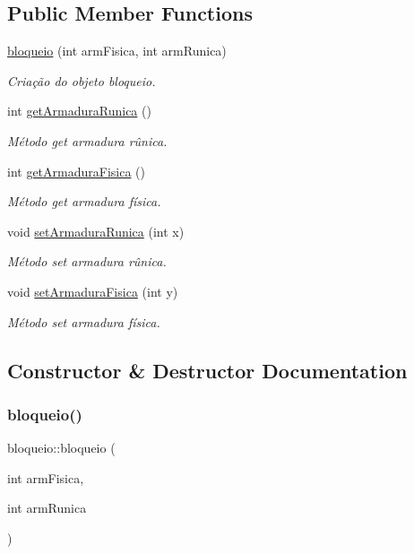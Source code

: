 \subsection*{Public Member Functions}
\begin{DoxyCompactItemize}
\item 
\mbox{\hyperlink{classbloqueio_aa43a8bb2b16af5907e8e78a54a432afe}{bloqueio}} (int arm\+Fisica, int arm\+Runica)
\begin{DoxyCompactList}\small\item\em Criação do objeto bloqueio. \end{DoxyCompactList}\item 
int \mbox{\hyperlink{classbloqueio_a1d06f5be69ab5f74f983fe7de1efe41c}{get\+Armadura\+Runica}} ()
\begin{DoxyCompactList}\small\item\em Método get armadura rûnica. \end{DoxyCompactList}\item 
int \mbox{\hyperlink{classbloqueio_a7bdccc95284f88b2c30fe9b35bc26a2b}{get\+Armadura\+Fisica}} ()
\begin{DoxyCompactList}\small\item\em Método get armadura física. \end{DoxyCompactList}\item 
void \mbox{\hyperlink{classbloqueio_a93d5e345503601ea3c06367e5ab0797b}{set\+Armadura\+Runica}} (int x)
\begin{DoxyCompactList}\small\item\em Método set armadura rûnica. \end{DoxyCompactList}\item 
void \mbox{\hyperlink{classbloqueio_ab47b5ba74cd295c9998ba042773d9814}{set\+Armadura\+Fisica}} (int y)
\begin{DoxyCompactList}\small\item\em Método set armadura física. \end{DoxyCompactList}\end{DoxyCompactItemize}


\subsection{Constructor \& Destructor Documentation}
\mbox{\label{classbloqueio_aa43a8bb2b16af5907e8e78a54a432afe}} 
\subsubsection{\texorpdfstring{bloqueio()}{bloqueio()}}
{\footnotesize\ttfamily bloqueio\+::bloqueio (\begin{DoxyParamCaption}\item[{int}]{arm\+Fisica,  }\item[{int}]{arm\+Runica }\end{DoxyParamCaption})}



